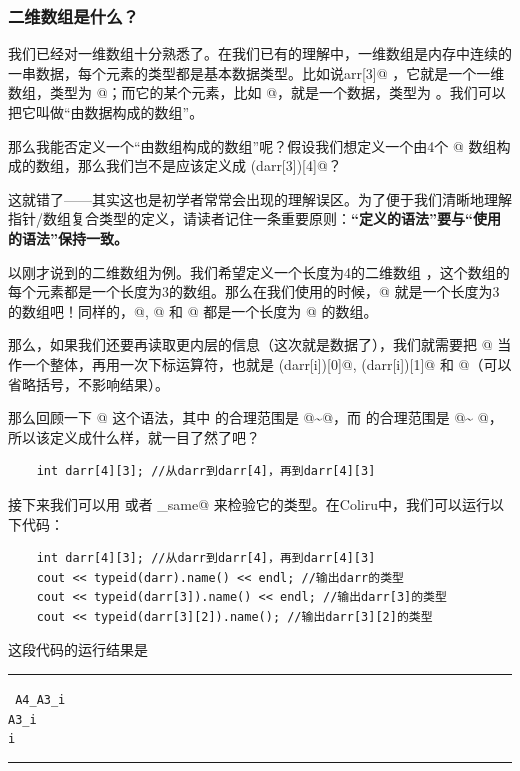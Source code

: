 \subsubsection*{二维数组是什么？}
我们已经对一维数组十分熟悉了。在我们已有的理解中，一维数组是内存中连续的一串数据，每个元素的类型都是基本数据类型。比如说\lstinline@int arr[3]@ ，它就是一个一维数组，类型为 \lstinline@int[3]@；而它的某个元素，比如 \lstinline@arr[0]@，就是一个数据，类型为 \lstinline@int@。我们可以把它叫做``由数据构成的数组''。\par
那么我能否定义一个``由数组构成的数组''呢？假设我们想定义一个由4个 \lstinline@arr[3]@ 数组构成的数组，那么我们岂不是应该定义成 \lstinline@int (darr[3])[4]@？\par
这就错了——其实这也是初学者常常会出现的理解误区。为了便于我们清晰地理解指针/数组复合类型的定义，请读者记住一条重要原则：\textbf{``定义的语法''要与``使用的语法''保持一致。}\par
以刚才说到的二维数组为例。我们希望定义一个长度为4的二维数组 \lstinline@darr@，这个数组的每个元素都是一个长度为3的数组。那么在我们使用的时候，\lstinline@darr[0]@ 就是一个长度为3的数组吧！同样的，\lstinline@darr[1]@, \lstinline@darr[2]@ 和 \lstinline@darr[3]@ 都是一个长度为 @ 的数组。\par
那么，如果我们还要再读取更内层的信息（这次就是数据了），我们就需要把 \lstinline@darr[i]@ 当作一个整体，再用一次下标运算符，也就是 \lstinline@(darr[i])[0]@, \lstinline@(darr[i])[1]@ 和 \lstinline@darr[i][2]@（可以省略括号，不影响结果）。\par
那么回顾一下 \lstinline@darr[i][j]@ 这个语法，其中 \lstinline@i@ 的合理范围是 @\~{}@，而 \lstinline@j@ 的合理范围是 @\~{} @，所以该定义成什么样，就一目了然了吧？
\begin{lstlisting}
    int darr[4][3]; //从darr到darr[4]，再到darr[4][3]
\end{lstlisting}
接下来我们可以用 \lstinline@typeid@ 或者 \lstinline@is_same@ 来检验它的类型。在Coliru中，我们可以运行以下代码：
\begin{lstlisting}
    int darr[4][3]; //从darr到darr[4]，再到darr[4][3]
    cout << typeid(darr).name() << endl; //输出darr的类型
    cout << typeid(darr[3]).name() << endl; //输出darr[3]的类型
    cout << typeid(darr[3][2]).name(); //输出darr[3][2]的类型
\end{lstlisting}
这段代码的运行结果是\\\noindent\rule{\linewidth}{.2pt}\texttt{
A4\_A3\_i\\
A3\_i\\
i
}\\\noindent\rule{\linewidth}{.2pt}\par
